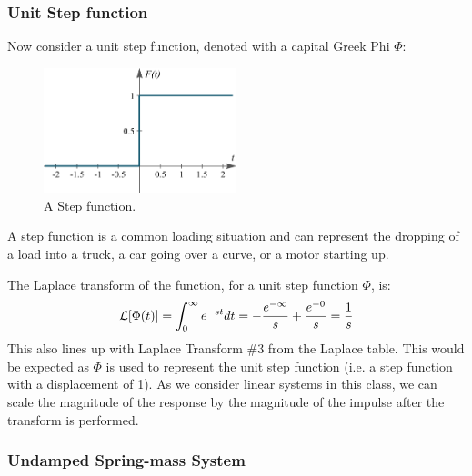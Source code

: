 \documentclass[12pt,letter]{article}
\begin{document}
\subsubsection{Unit Step function}
Now consider a unit step function, denoted with a capital Greek Phi  $\Phi$: 

\begin{figure}[H]
	\centering
	\includegraphics[width=0.5\textwidth]{../figures/unit_step.png}
	\caption{A Step function. }
\end{figure}

A step function is a common loading situation and can represent the dropping of a load into a truck, a car going over a curve, or a motor starting up. 


The Laplace transform of the function, for a unit step function $\Phi$, is: 
\begin{equation*}
\mathcal{L}{\left[\Phi(t)\right]} = \int_{0}^{\infty} e^{-st}dt = -\frac{e^{-\infty}}{s} +\frac{e^{-0}}{s} =\frac{1}{s}
\end{equation*}
This also lines up with Laplace Transform \#3 from the Laplace table. This would be expected as $\Phi$ is used to represent the unit step function (i.e. a step function with a displacement of 1). As we consider linear systems in this class, we can scale the magnitude of the response by the magnitude of the impulse after the transform is performed. 

\subsubsection{Undamped Spring-mass System}
\end{document}
